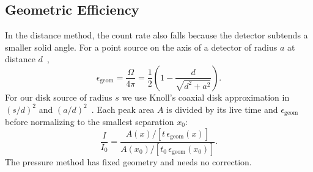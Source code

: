 \subsection{Geometric Efficiency}
\label{subsec:geom}

In the distance method, the count rate also falls because the detector subtends a smaller solid angle. For a point source on the axis of a detector of radius $a$ at distance $d$~\cite{knoll},
\begin{equation}
    \epsilon_{\text{geom}} = \frac{\Omega}{4\pi} = \frac{1}{2}\left(1 - \frac{d}{\sqrt{d^2 + a^2}}\right).
    \label{eq:solidangle}
\end{equation}
For our disk source of radius $s$ we use Knoll's coaxial disk approximation in $(s/d)^2$ and $(a/d)^2$~\cite{knoll}. Each peak area $A$ is divided by its live time and $\epsilon_{\text{geom}}$ before normalizing to the smallest separation $x_0$:
\begin{equation}
    \frac{I}{I_0} = \frac{A(x)/[t\,\epsilon_{\text{geom}}(x)]}{A(x_0)/[t_0\,\epsilon_{\text{geom}}(x_0)]}.
    \label{eq:attenuation}
\end{equation}
The pressure method has fixed geometry and needs no correction.
